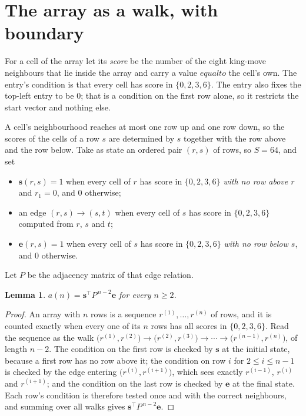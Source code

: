 \documentclass[11pt,a4paper]{article}
\theoremstyle{plain}
\newtheorem{lemma}[theorem]{Lemma}
\theoremstyle{definition}
\begin{document}
\section{The array as a walk, with boundary}

For a cell of the array let its \emph{score} be the number of the eight king-move neighbours that lie inside
the array and carry a value $equal to$ the cell's own. The entry's condition is that every cell
has score in $\{0,2,3,6\}$. The entry also fixes the top-left entry to be $0$; that is a condition on the first row alone, so it restricts the start vector and nothing else.

A cell's neighbourhood reaches at most one row up and one row down, so the scores of the
cells of a row $s$ are determined by $s$ together with the row above and the row below.
Take as state an ordered pair $(r,s)$ of rows, so $S=64$, and set
\begin{itemize}
\item $\mathbf{s}(r,s)=1$ when every cell of $r$ has score in $\{0,2,3,6\}$ \emph{with no row
above $r$} and $r_1=0$, and $0$ otherwise;
\item an edge $(r,s)\to(s,t)$ when every cell of $s$ has score in $\{0,2,3,6\}$ computed from
$r$, $s$ and $t$;
\item $\mathbf{e}(r,s)=1$ when every cell of $s$ has score in $\{0,2,3,6\}$ \emph{with no row
below $s$}, and $0$ otherwise.
\end{itemize}
Let $P$ be the adjacency matrix of that edge relation.

\begin{lemma}\label{lem:walk}
$a(n)=\mathbf{s}^{\!\top}P^{\,n-2}\mathbf{e}$ for every $n\ge2$.
\end{lemma}

\begin{proof}
An array with $n$ rows is a sequence $r^{(1)},\dots,r^{(n)}$ of rows, and it is counted
exactly when every one of its $n$ rows has all scores in $\{0,2,3,6\}$. Read the sequence as the
walk $\bigl(r^{(1)},r^{(2)}\bigr)\to\bigl(r^{(2)},r^{(3)}\bigr)\to\cdots\to
\bigl(r^{(n-1)},r^{(n)}\bigr)$, of length $n-2$. The condition on the first row is
checked by $\mathbf{s}$ at the initial state, because a first row has no row above it; the
condition on row $i$ for $2\le i\le n-1$ is checked by the edge entering
$\bigl(r^{(i)},r^{(i+1)}\bigr)$, which sees exactly $r^{(i-1)}$, $r^{(i)}$ and
$r^{(i+1)}$; and the condition on the last row is checked by $\mathbf{e}$ at the final
state. Each row's condition is therefore tested once and with the correct neighbours, and
summing over all walks gives $\mathbf{s}^{\!\top}P^{\,n-2}\mathbf{e}$.
\end{proof}
\end{document}
